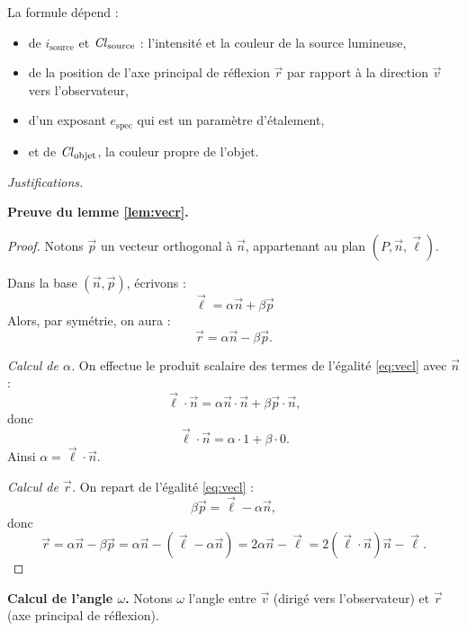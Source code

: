 \documentclass[11pt,class=report,crop=false]{standalone}
\begin{document}

La formule dépend :
\begin{itemize}
  \item de $i_{\text{source}}$ et $\operatorname{\it Cl}_{\text{source}}$ : l'intensité et la couleur de la source lumineuse,
  \item de la position de l'axe principal de réflexion $\vec r$ par rapport à la direction $\vec v$ vers l'observateur,
  \item d'un exposant $e_{\text{spec}}$ qui est un paramètre d'étalement,
  \item et de $\operatorname{\it Cl}_{\text{objet}}$, la couleur propre de l'objet.
\end{itemize}


\bigskip

\emph{Justifications.}

\textbf{Preuve du lemme \ref{lem:vecr}.}
\begin{proof}
Notons $\vec p$ un vecteur orthogonal à $\vec n$, appartenant au plan $(P,\vec n,\vec \ell)$. 

Dans la base $(\vec n, \vec p)$, écrivons :
\begin{equation}
\label{eq:vecl}
\vec \ell = \alpha \vec n + \beta \vec p
\end{equation}
Alors, par symétrie, on aura :
$$\vec r = \alpha \vec n - \beta \vec p.$$

\emph{Calcul de $\alpha$.} On effectue le produit scalaire des termes de l'égalité \eqref{eq:vecl} avec $\vec n$ :
$$\vec \ell \cdot \vec n = \alpha \vec n \cdot \vec n + \beta \vec p  \cdot \vec n,$$
donc 
$$\vec \ell \cdot \vec n = \alpha \cdot 1 + \beta \cdot 0.$$
Ainsi $\alpha = \vec \ell \cdot \vec n$.

\emph{Calcul de $\vec r$.} On repart de l'égalité \eqref{eq:vecl} :
$$\beta \vec p = \vec \ell - \alpha \vec n,$$
donc
$$\vec r 
= \alpha \vec n - \beta \vec p 
= \alpha \vec n -(\vec \ell - \alpha \vec n)
= 2\alpha \vec n - \vec\ell 
= 2(\vec \ell \cdot \vec n) \vec n - \vec\ell.$$

\end{proof}

\medskip
\textbf{Calcul de l'angle $\omega$.}
Notons $\omega$ l'angle entre $\vec v$ (dirigé vers l'observateur) et $\vec r$ (axe principal de réflexion). 

\end{document}
